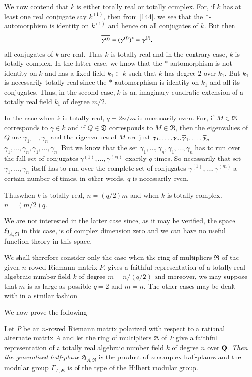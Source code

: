 We now contend that $k$ is either totally real or totally
complex. For, if $k$ has at least one real conjugate say $k^{(1)}$,
then from \eqref{144}, we see that the $\ast$-automorphism is identity
on $k^{(1)}$ and hence on all conjugates of $k$. But then
$$
\overline{\gamma^{(i)}}=(\gamma^{(i)})^{\ast}=\gamma^{(i)}.
$$
\ie all conjugates of $k$ are real. Thus $k$ is totally real and in
the contrary case, $k$ is totally complex. In the latter case, we know
that the $\ast$-automorphism is not identity on $k$ and has a fixed
field $k_{1}\subset k$ such that $k$ has degree $2$ over $k_{1}$. But
$k_{1}$ is necessarily totally real since the $\ast$-automorphism is
identity on $k_{1}$ and all its conjugates. Thus, in the second case,
$k$ is an imaginary quadratic extension of a totally real field
$k_{1}$ of degree $m/2$.

In the case when $k$ is totally real, $q=2n/m$ is necessarily
even. For, if $M\in\mathfrak{R}$ corresponds to $\gamma\in k$ and if
$Q\in\mathfrak{D}$ corresponds to $M\in\mathfrak{R}$, then the
eigenvalues of $Q$ are $\gamma_{1},\ldots,\gamma_{n}$ and the
eigenvalues of $M$ are just
$\gamma_{1},\ldots,\gamma_{n},\overline{\gamma}_{1},\ldots,\overline{\gamma}_{n}$
\ie $\gamma_{1},\ldots,\gamma_{n},\gamma_{1},\ldots,\gamma_{n}$. But
we know that the set
$\gamma_{1},\ldots,\gamma_{n},\gamma_{1},\ldots,\gamma_{n}$ has to run
over the full set of conjugates $\gamma^{(1)},\ldots,\gamma^{(m)}$
exactly $q$ times. So necessarily that set
$\gamma_{1},\ldots,\gamma_{n}$ itself has to run over the complete set
of conjugates $\gamma^{(1)},\ldots,\gamma^{(m)}$ a certain number of
times, \ie in other words, $q$ is necessarily even.

Thus\pageoriginale when $k$ is totally real, $n=(q/2)m$ and when $k$
is totally complex, $n=(m/2)q$.

We are not interested in the latter case since, as it may be verified,
the space $\mathfrak{H}_{A,\mathfrak{R}}$ in this case, is of complex
dimension zero and we can have no useful function-theory in this
space.

We shall therefore consider only the case when the ring of multipliers
$\mathfrak{R}$ of the given $n$-rowed Riemann matrix $P$, gives a
faithful representation of a totally real algebraic number field $k$
of degree $m=n/(q/2)$ and moreover, we may suppose that $m$ is as
large as possible \ie $q=2$ and $m=n$. The other cases may be dealt
with in a similar fashion.

We now prove the following

\begin{thm}\label{thm15}
Let $P$ be an $n$-rowed Riemann matrix polarized with respect to a
rational alternate matrix $A$ and let the ring of multipliers
$\mathfrak{R}$ of $P$ give a faithful representation of a totally real
algebraic number field $k$ of degree $n$ over $\mathbf{Q}$. {\em Then the
  generalized half-plane} $\mathfrak{H}_{A,\mathfrak{R}}$ is the
product of $n$ complex half-planes and the modular group
$\Gamma_{A,\mathfrak{R}}$ is of the type of the Hilbert modular group.
\end{thm}

